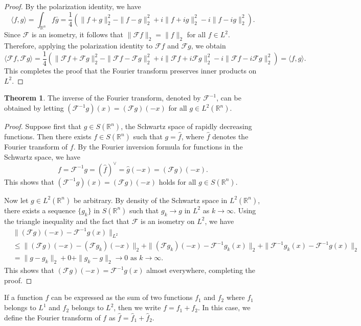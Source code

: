 \documentclass[12pt,openany]{book}
\theoremstyle{definition}
\newtheorem{theorem}{Theorem}[section]
\begin{document}
\begin{proof}
    By the polarization identity, we have
$$
\langle f, g\rangle = \int_{\mathbb{R}^n} f \bar{g} = \frac{1}{4}\left(\|f+g\|_2^2 - \|f-g\|_2^2 + i\|f+ig\|_2^2 - i\|f-ig\|_2^2\right).
$$
Since $\mathcal{F}$ is an isometry, it follows that $\|\mathcal{F}f\|_2 = \|f\|_2$ for all $f \in L^2$. Therefore, applying the polarization identity to $\mathcal{F}f$ and $\mathcal{F}g$, we obtain
$$
\langle \mathcal{F}f, \mathcal{F}g\rangle = \frac{1}{4}\left(\|\mathcal{F}f+\mathcal{F}g\|_2^2 - \|\mathcal{F}f-\mathcal{F}g\|_2^2 + i\|\mathcal{F}f+i\mathcal{F}g\|_2^2 - i\|\mathcal{F}f-i\mathcal{F}g\|_2^2\right) = \langle f, g\rangle.
$$
This completes the proof that the Fourier transform preserves inner products on $L^2$.
\end{proof}
\begin{theorem}
    The inverse of the Fourier transform, denoted by $\mathcal{F}^{-1}$, can be obtained by letting $(\mathcal{F}^{-1}g)(x) = (\mathcal{F}g)(-x)$ for all $g \in L^2(\mathbb{R}^n)$.
\end{theorem}
\begin{proof}
    Suppose first that $g \in S(\mathbb{R}^n)$, the Schwartz space of rapidly decreasing functions. Then there exists $f \in S(\mathbb{R}^n)$ such that $g = \hat{f}$, where $\hat{f}$ denotes the Fourier transform of $f$. By the Fourier inversion formula for functions in the Schwartz space, we have
$$
f = \mathcal{F}^{-1}g = (\hat{f})^\vee = \hat{g}(-x) = (\mathcal{F}g)(-x).
$$
This shows that $(\mathcal{F}^{-1}g)(x) = (\mathcal{F}g)(-x)$ holds for all $g \in S(\mathbb{R}^n)$.

Now let $g \in L^2(\mathbb{R}^n)$ be arbitrary. By density of the Schwartz space in $L^2(\mathbb{R}^n)$, there exists a sequence $\{g_k\}$ in $S(\mathbb{R}^n)$ such that $g_k \to g$ in $L^2$ as $k \to \infty$. Using the triangle inequality and the fact that $\mathcal{F}$ is an isometry on $L^2$, we have
$$
\begin{aligned}
&\|(\mathcal{F}g)(-x) - \mathcal{F}^{-1}g(x)\|_{L^2} \\
&\leq \|(\mathcal{F}g)(-x) - (\mathcal{F}g_k)(-x)\|_2 + \|(\mathcal{F}g_k)(-x) - \mathcal{F}^{-1}g_k(x)\|_2 + \|\mathcal{F}^{-1}g_k(x) - \mathcal{F}^{-1}g(x)\|_2 \\
&= \|g - g_k\|_2 + 0 + \|g_k - g\|_2 \to 0 \text{ as } k \to \infty.
\end{aligned}
$$
This shows that $(\mathcal{F}g)(-x) = \mathcal{F}^{-1}g(x)$ almost everywhere, completing the proof.
\end{proof}
If a function $f$ can be expressed as the sum of two functions $f_1$ and $f_2$ where $f_1$ belongs to $L^1$ and $f_2$ belongs to $L^2$, then we write $f = f_1 + f_2$. In this case, we define the Fourier transform of $f$ as $\hat{f} = \hat{f}_1 + \hat{f}_2$.
\end{document}
